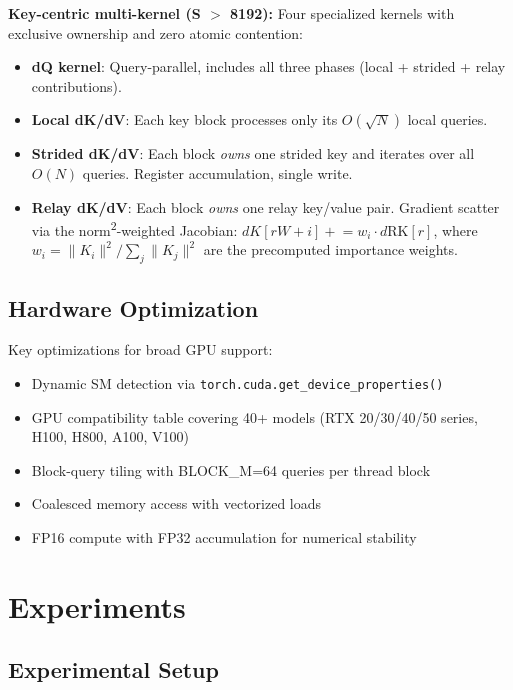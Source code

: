 \documentclass{article}
\begin{document}
    \textbf{Key-centric multi-kernel (S $>$ 8192):} Four specialized kernels with exclusive ownership and zero atomic contention:
    \begin{itemize}
        \item \textbf{dQ kernel}: Query-parallel, includes all three phases (local + strided + relay contributions).
        \item \textbf{Local dK/dV}: Each key block processes only its $O(\sqrt{N})$ local queries.
        \item \textbf{Strided dK/dV}: Each block \textit{owns} one strided key and iterates over all $O(N)$ queries. Register accumulation, single write.
        \item \textbf{Relay dK/dV}: Each block \textit{owns} one relay key/value pair. Gradient scatter via the norm\textsuperscript{2}-weighted Jacobian: $dK[rW{+}i] \mathrel{+}= w_i \cdot d\text{RK}[r]$, where $w_i = \|K_i\|^2 / \sum_j \|K_j\|^2$ are the precomputed importance weights.
    \end{itemize}

    \subsection{Hardware Optimization}

    Key optimizations for broad GPU support:
    \begin{itemize}
        \item Dynamic SM detection via \texttt{torch.cuda.get\_device\_properties()}
        \item GPU compatibility table covering 40+ models (RTX 20/30/40/50 series, H100, H800, A100, V100)
        \item Block-query tiling with BLOCK\_M=64 queries per thread block
        \item Coalesced memory access with vectorized loads
        \item FP16 compute with FP32 accumulation for numerical stability
    \end{itemize}

    \section{Experiments}
    \label{sec:experiments}

    \subsection{Experimental Setup}
    \label{sec:setup}
\end{document}
